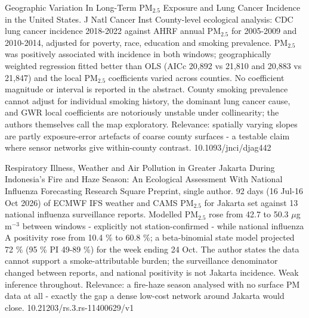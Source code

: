 \documentclass[10pt]{article}
\begin{document}
{Geographic Variation In Long-Term PM$_{2.5}$ Exposure and Lung Cancer Incidence in the United States.}
{J Natl Cancer Inst}
{County-level ecological analysis: CDC lung cancer incidence 2018-2022 against AHRF annual PM$_{2.5}$ for 2005-2009 and 2010-2014, adjusted for poverty, race, education and smoking prevalence. PM$_{2.5}$ was positively associated with incidence in both windows; geographically weighted regression fitted better than OLS (AICc 20,892 vs 21,810 and 20,883 vs 21,847) and the local PM$_{2.5}$ coefficients varied across counties. No coefficient magnitude or interval is reported in the abstract. County smoking prevalence cannot adjust for individual smoking history, the dominant lung cancer cause, and GWR local coefficients are notoriously unstable under collinearity; the authors themselves call the map exploratory. Relevance: spatially varying slopes are partly exposure-error artefacts of coarse county surfaces - a testable claim where sensor networks give within-county contrast.}
{10.1093/jnci/djag442}

{Respiratory Illness, Weather and Air Pollution in Greater Jakarta During Indonesia's Fire and Haze Season: An Ecological Assessment With National Influenza Forecasting}
{Research Square}
{Preprint, single author. 92 days (16 Jul-16 Oct 2026) of ECMWF IFS weather and CAMS PM$_{2.5}$ for Jakarta set against 13 national influenza surveillance reports. Modelled PM$_{2.5}$ rose from 42.7 to 50.3 $\mu$g\,m$^{-3}$ between windows - explicitly not station-confirmed - while national influenza A positivity rose from 10.4 \% to 60.8 \%; a beta-binomial state model projected 72 \% (95 \% PI 49-89 \%) for the week ending 24 Oct. The author states the data cannot support a smoke-attributable burden; the surveillance denominator changed between reports, and national positivity is not Jakarta incidence. Weak inference throughout. Relevance: a fire-haze season analysed with no surface PM data at all - exactly the gap a dense low-cost network around Jakarta would close.}
{10.21203/rs.3.rs-11400629/v1}

\par{}\baselineskip{}\baselineskip
{}
\end{document}
